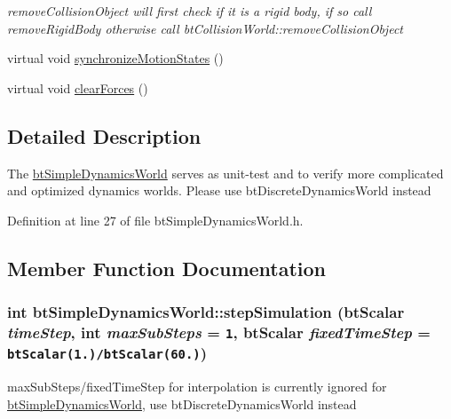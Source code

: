 \begin{CompactItemize}
\begin{CompactList}\small\item\em removeCollisionObject will first check if it is a rigid body, if so call removeRigidBody otherwise call btCollisionWorld::removeCollisionObject \item\end{CompactList}\item 
virtual void \hyperlink{classbt_simple_dynamics_world_91e996f5ce6e465e805565ee0ba14824}{synchronizeMotionStates} ()
\item 
virtual void \hyperlink{classbt_simple_dynamics_world_c44c80444f4d6d4e3c2955dd43b7a93a}{clearForces} ()
\end{CompactItemize}


\subsection{Detailed Description}
The \hyperlink{classbt_simple_dynamics_world}{btSimpleDynamicsWorld} serves as unit-test and to verify more complicated and optimized dynamics worlds. Please use btDiscreteDynamicsWorld instead 

Definition at line 27 of file btSimpleDynamicsWorld.h.

\subsection{Member Function Documentation}
\hypertarget{classbt_simple_dynamics_world_f6b4810b5018cbaf09f82839111a243d}{
\subsubsection[stepSimulation]{\setlength{\rightskip}{0pt plus 5cm}int btSimpleDynamicsWorld::stepSimulation (btScalar {\em timeStep}, \/  int {\em maxSubSteps} = {\tt 1}, \/  btScalar {\em fixedTimeStep} = {\tt btScalar(1.)/btScalar(60.)})}}
\label{classbt_simple_dynamics_world_f6b4810b5018cbaf09f82839111a243d}


maxSubSteps/fixedTimeStep for interpolation is currently ignored for \hyperlink{classbt_simple_dynamics_world}{btSimpleDynamicsWorld}, use btDiscreteDynamicsWorld instead 



